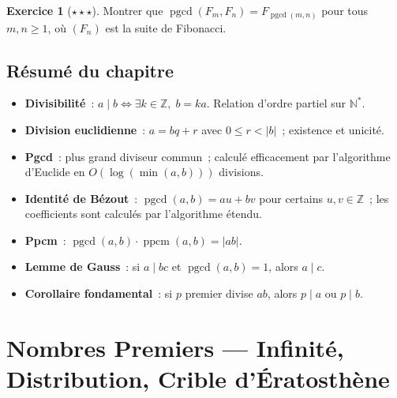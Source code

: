 \documentclass[12pt,a4paper,openany]{book}
\theoremstyle{definition}
\newtheorem{exercice}{Exercice}[chapter]
\theoremstyle{plain}
\theoremstyle{remark}
\newcommand{\N}{\mathbb{N}}
\newcommand{\Z}{\mathbb{Z}}
\newcommand{\abs}[1]{\left|#1\right|}
\DeclareMathOperator{\pgcd}{pgcd}
\DeclareMathOperator{\ppcm}{ppcm}
\begin{document}
\begin{exercice}[$\star\star\star$]
\label{exo:ch1:olympiade3}
Montrer que $\pgcd(F_m, F_n) = F_{\pgcd(m,n)}$ pour tous $m, n \geq 1$, où $(F_n)$
est la suite de Fibonacci.
\end{exercice}

\section{Résumé du chapitre}
\label{sec:ch1:resume}

\begin{tcolorbox}[enhanced,colback=blue!3,colframe=blue!50!black,
  title={\textbf{Chapitre 1 --- Résumé}},fonttitle=\large,
  breakable]
\begin{itemize}[leftmargin=1.5cm]
  \item \textbf{Divisibilité}~: $a \mid b \iff \exists k \in \Z,\; b = ka$.
    Relation d'ordre partiel sur $\N^*$.
  \item \textbf{Division euclidienne}~: $a = bq + r$ avec $0 \leq r < \abs{b}$~;
    existence et unicité.
  \item \textbf{Pgcd}~: plus grand diviseur commun~; calculé efficacement par
    l'algorithme d'Euclide en $O(\log(\min(a,b)))$ divisions.
  \item \textbf{Identité de Bézout}~: $\pgcd(a,b) = au + bv$ pour certains
    $u, v \in \Z$~; les coefficients sont calculés par l'algorithme étendu.
  \item \textbf{Ppcm}~: $\pgcd(a,b) \cdot \ppcm(a,b) = \abs{ab}$.
  \item \textbf{Lemme de Gauss}~: si $a \mid bc$ et $\pgcd(a,b) = 1$, alors
    $a \mid c$.
  \item \textbf{Corollaire fondamental}~: si $p$ premier divise $ab$, alors
    $p \mid a$ ou $p \mid b$.
\end{itemize}
\end{tcolorbox}



\chapter{Nombres Premiers --- Infinité, Distribution, Crible d'Ératosthène}
\label{ch:premiers}
\end{document}
